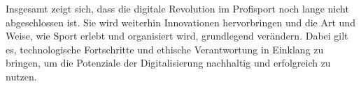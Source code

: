 \documentclass[
  number]{elsarticle}
\begin{document}
Insgesamt zeigt sich, dass die digitale Revolution im Profisport noch
lange nicht abgeschlossen ist. Sie wird weiterhin Innovationen
hervorbringen und die Art und Weise, wie Sport erlebt und organisiert
wird, grundlegend verändern. Dabei gilt es, technologische Fortschritte
und ethische Verantwortung in Einklang zu bringen, um die Potenziale der
Digitalisierung nachhaltig und erfolgreich zu nutzen.

\newpage


  
\end{document}
